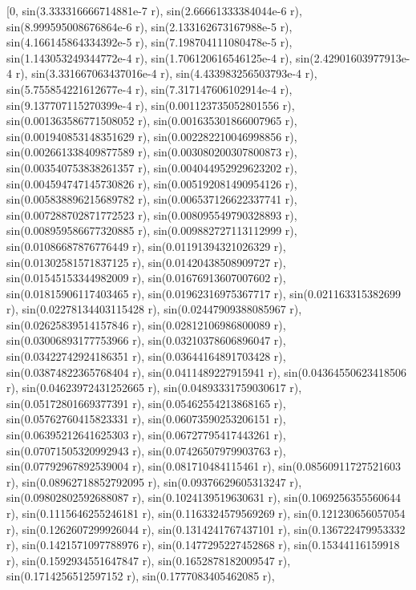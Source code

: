 \documentclass[12pt,arial,letterpaper]{book}
\begin{document}
\begin{eulercomment}
\begin{eulercomment}
\begin{eulercomment}
\begin{eulercomment}
\begin{eulercomment}
\begin{eulercomment}
\begin{eulercomment}
\begin{eulercomment}
\begin{eulercomment}
\begin{eulercomment}
\begin{eulercomment}
\begin{eulercomment}
\begin{eulercomment}
\begin{eulercomment}
\begin{eulercomment}
\begin{eulercomment}
\begin{eulercomment}
\begin{eulercomment}
\begin{eulercomment}
\begin{eulercomment}
\begin{eulercomment}
\begin{eulercomment}
\begin{euleroutput}
          [0, sin(3.333316666714881e-7 r), sin(2.66661333384044e-6 r), 
  sin(8.999595008676864e-6 r), sin(2.133162673167988e-5 r), 
  sin(4.166145864334392e-5 r), sin(7.198704111080478e-5 r), 
  sin(1.143053249344772e-4 r), sin(1.706120616546125e-4 r), 
  sin(2.42901603977913e-4 r), sin(3.331667063437016e-4 r), 
  sin(4.433983256503793e-4 r), sin(5.755854221612677e-4 r), 
  sin(7.317147606102914e-4 r), sin(9.137707115270399e-4 r), 
  sin(0.001123735052801556 r), sin(0.001363586771508052 r), 
  sin(0.001635301866007965 r), sin(0.001940853148351629 r), 
  sin(0.002282210046998856 r), sin(0.002661338409877589 r), 
  sin(0.003080200307800873 r), sin(0.003540753838261357 r), 
  sin(0.004044952929623202 r), sin(0.004594747145730826 r), 
  sin(0.005192081490954126 r), sin(0.005838896215689782 r), 
  sin(0.006537126622337741 r), sin(0.007288702871772523 r), 
  sin(0.008095549790328893 r), sin(0.008959586677320885 r), 
  sin(0.009882727113112999 r), sin(0.01086687876776449 r), 
  sin(0.01191394321026329 r), sin(0.01302581571837125 r), 
  sin(0.01420438508909727 r), sin(0.01545153344982009 r), 
  sin(0.01676913607007602 r), sin(0.01815906117403465 r), 
  sin(0.01962316975367717 r), sin(0.021163315382699 r), 
  sin(0.02278134403115428 r), sin(0.02447909388085967 r), 
  sin(0.02625839514157846 r), sin(0.02812106986800089 r), 
  sin(0.03006893177753966 r), sin(0.03210378606896047 r), 
  sin(0.03422742924186351 r), sin(0.03644164891703428 r), 
  sin(0.03874822365768404 r), sin(0.0411489227915941 r), 
  sin(0.04364550623418506 r), sin(0.04623972431252665 r), 
  sin(0.04893331759030617 r), sin(0.05172801669377391 r), 
  sin(0.05462554213868165 r), sin(0.05762760415823331 r), 
  sin(0.06073590253206151 r), sin(0.06395212641625303 r), 
  sin(0.06727795417443261 r), sin(0.07071505320992943 r), 
  sin(0.07426507979903763 r), sin(0.07792967892539004 r), 
  sin(0.081710484115461 r), sin(0.08560911727521603 r), 
  sin(0.08962718852792095 r), sin(0.09376629605313247 r), 
  sin(0.09802802592688087 r), sin(0.1024139519630631 r), 
  sin(0.1069256355560644 r), sin(0.1115646255246181 r), 
  sin(0.1163324579569269 r), sin(0.121230656057054 r), 
  sin(0.1262607299926044 r), sin(0.1314241767437101 r), 
  sin(0.136722479953332 r), sin(0.1421571097788976 r), 
  sin(0.1477295227452868 r), sin(0.15344116159918 r), 
  sin(0.1592934551647847 r), sin(0.1652878182009547 r), 
  sin(0.1714256512597152 r), sin(0.1777083405462085 r), 

\end{euleroutput}
\end{eulercomment}
\end{eulercomment}
\end{eulercomment}
\end{eulercomment}
\end{eulercomment}
\end{eulercomment}
\end{eulercomment}
\end{eulercomment}
\end{eulercomment}
\end{eulercomment}
\end{eulercomment}
\end{eulercomment}
\end{eulercomment}
\end{eulercomment}
\end{eulercomment}
\end{eulercomment}
\end{eulercomment}
\end{eulercomment}
\end{eulercomment}
\end{eulercomment}
\end{eulercomment}
\end{eulercomment}
\end{document}
